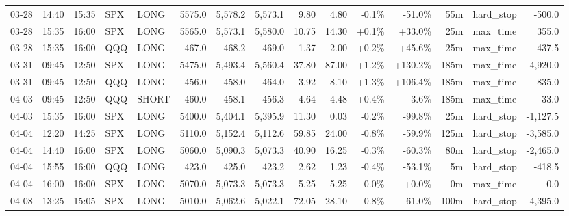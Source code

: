\documentclass[11pt,a4paper,twoside]{article}
\begin{document}
\begin{landscape}
\begin{center}
\begin{longtable}{>{\color{txtmain}}l l l l l r r r r r r r r >{\color{txtmain}}l r}
03-28 & 14:40 & 15:35 & SPX & LONG & 5575.0 & 5,578.2 & 5,573.1 & 9.80 & 4.80 & \textcolor{lossred}{-0.1\%} & \textcolor{lossred}{-51.0\%} & 55m & hard\_stop & \textcolor{lossred}{-500.0} \\
03-28 & 15:35 & 16:00 & SPX & LONG & 5565.0 & 5,573.1 & 5,580.0 & 10.75 & 14.30 & \textcolor{wingreen}{+0.1\%} & \textcolor{wingreen}{+33.0\%} & 25m & max\_time & \textcolor{wingreen}{355.0} \\
03-28 & 15:35 & 16:00 & QQQ & LONG & 467.0 & 468.2 & 469.0 & 1.37 & 2.00 & \textcolor{wingreen}{+0.2\%} & \textcolor{wingreen}{+45.6\%} & 25m & max\_time & \textcolor{wingreen}{437.5} \\
03-31 & 09:45 & 12:50 & SPX & LONG & 5475.0 & 5,493.4 & 5,560.4 & 37.80 & 87.00 & \textcolor{wingreen}{+1.2\%} & \textcolor{wingreen}{+130.2\%} & 185m & max\_time & \textcolor{wingreen}{4,920.0} \\
03-31 & 09:45 & 12:50 & QQQ & LONG & 456.0 & 458.0 & 464.0 & 3.92 & 8.10 & \textcolor{wingreen}{+1.3\%} & \textcolor{wingreen}{+106.4\%} & 185m & max\_time & \textcolor{wingreen}{835.0} \\
04-03 & 09:45 & 12:50 & QQQ & SHORT & 460.0 & 458.1 & 456.3 & 4.64 & 4.48 & \textcolor{wingreen}{+0.4\%} & \textcolor{lossred}{-3.6\%} & 185m & max\_time & \textcolor{lossred}{-33.0} \\
04-03 & 15:35 & 16:00 & SPX & LONG & 5400.0 & 5,404.1 & 5,395.9 & 11.30 & 0.03 & \textcolor{lossred}{-0.2\%} & \textcolor{lossred}{-99.8\%} & 25m & hard\_stop & \textcolor{lossred}{-1,127.5} \\
04-04 & 12:20 & 14:25 & SPX & LONG & 5110.0 & 5,152.4 & 5,112.6 & 59.85 & 24.00 & \textcolor{lossred}{-0.8\%} & \textcolor{lossred}{-59.9\%} & 125m & hard\_stop & \textcolor{lossred}{-3,585.0} \\
04-04 & 14:40 & 16:00 & SPX & LONG & 5060.0 & 5,090.3 & 5,073.3 & 40.90 & 16.25 & \textcolor{lossred}{-0.3\%} & \textcolor{lossred}{-60.3\%} & 80m & hard\_stop & \textcolor{lossred}{-2,465.0} \\
04-04 & 15:55 & 16:00 & QQQ & LONG & 423.0 & 425.0 & 423.2 & 2.62 & 1.23 & \textcolor{lossred}{-0.4\%} & \textcolor{lossred}{-53.1\%} & 5m & hard\_stop & \textcolor{lossred}{-418.5} \\
04-04 & 16:00 & 16:00 & SPX & LONG & 5070.0 & 5,073.3 & 5,073.3 & 5.25 & 5.25 & \textcolor{lossred}{-0.0\%} & \textcolor{wingreen}{+0.0\%} & 0m & max\_time & \textcolor{wingreen}{0.0} \\
04-08 & 13:25 & 15:05 & SPX & LONG & 5010.0 & 5,062.6 & 5,022.1 & 72.05 & 28.10 & \textcolor{lossred}{-0.8\%} & \textcolor{lossred}{-61.0\%} & 100m & hard\_stop & \textcolor{lossred}{-4,395.0} \\

\end{longtable}
\end{center}
\end{landscape}
\end{document}

